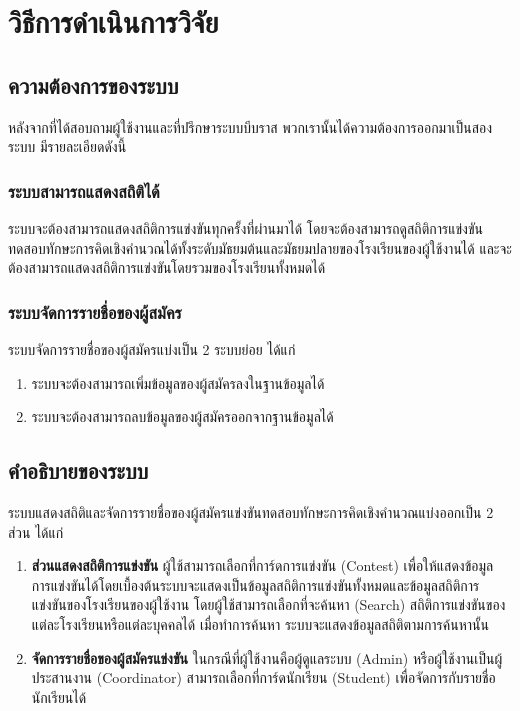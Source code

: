 \chapter{วิธีการดำเนินการวิจัย}
\label{chapter:experiment}

\section{ความต้องการของระบบ}

หลังจากที่ได้สอบถามผู้ใช้งานและที่ปรึกษาระบบบีบราส พวกเรานั้นได้ความต้องการออกมาเป็นสองระบบ มีรายละเอียดดังนี้

\subsection{ระบบสามารถแสดงสถิติได้}

ระบบจะต้องสามารถแสดงสถิติการแข่งขันทุกครั้งที่ผ่านมาได้
โดยจะต้องสามารถดูสถิติการแข่งขันทดสอบทักษะการคิดเชิงคำนวณได้ทั้งระดับมัธยมต้นและมัธยมปลายของโรงเรียนของผู้ใช้งานได้
และจะต้องสามารถแสดงสถิติการแข่งขันโดยรวมของโรงเรียนทั้งหมดได้

\subsection{ระบบจัดการรายชื่อของผู้สมัคร}

ระบบจัดการรายชื่อของผู้สมัครแบ่งเป็น 2 ระบบย่อย ได้แก่

\begin{enumerate}
    \item ระบบจะต้องสามารถเพิ่มข้อมูลของผู้สมัครลงในฐานข้อมูลได้
    \item ระบบจะต้องสามารถลบข้อมูลของผู้สมัครออกจากฐานข้อมูลได้
\end{enumerate}

\section{คำอธิบายของระบบ}

ระบบแสดงสถิติและจัดการรายชื่อของผู้สมัครแข่งขันทดสอบทักษะการคิดเชิงคำนวณแบ่งออกเป็น 2 ส่วน ได้แก่

\begin{enumerate}
    \item \textbf{ส่วนแสดงสถิติการแข่งขัน} ผู้ใช้สามารถเลือกที่การ์ดการแข่งขัน (Contest) เพื่อให้แสดงข้อมูลการแข่งขันได้โดยเบื้องต้นระบบจะแสดงเป็นข้อมูลสถิติการแข่งขันทั้งหมดและข้อมูลสถิติการแข่งขันของโรงเรียนของผู้ใช้งาน โดยผู้ใช้สามารถเลือกที่จะค้นหา (Search) สถิติการแข่งขันของแต่ละโรงเรียนหรือแต่ละบุคคลได้ เมื่อทำการค้นหา ระบบจะแสดงข้อมูลสถิติตามการค้นหานั้น
    \item \textbf{จัดการรายชื่อของผู้สมัครแข่งขัน} ในกรณีที่ผู้ใช้งานคือผู้ดูแลระบบ (Admin) หรือผู้ใช้งานเป็นผู้ประสานงาน (Coordinator) สามารถเลือกที่การ์ดนักเรียน (Student) เพื่อจัดการกับรายชื่อนักเรียนได้
\end{enumerate}

